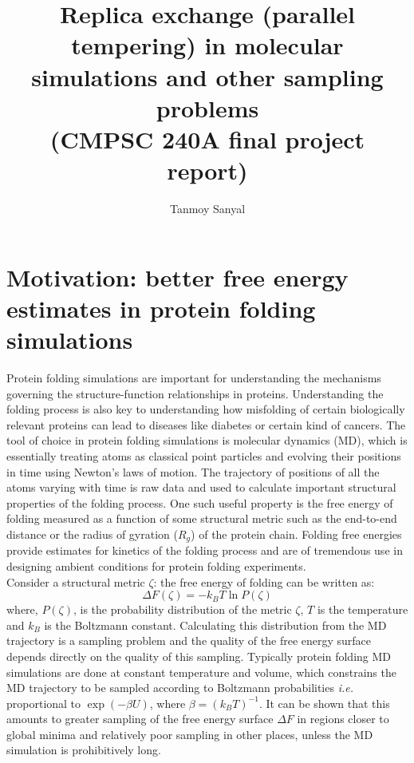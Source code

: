 \documentclass[12pt,letterpaper]{article}
\author{Tanmoy Sanyal}
\title{Replica exchange (parallel tempering) in molecular simulations and other sampling problems \\ (CMPSC 240A final project report)}
\begin{document}
\maketitle


\section*{Motivation: better free energy estimates in protein folding simulations}
\noindent Protein folding simulations are important for understanding the mechanisms governing the structure-function relationships in proteins. Understanding the folding process is also key to understanding how misfolding of certain biologically relevant proteins can lead to diseases like diabetes or certain kind of cancers. The tool of choice in protein folding simulations is molecular dynamics (MD), which is essentially treating atoms as classical point particles and evolving their positions in time using Newton's laws of motion. The trajectory of positions of all the atoms varying with time is raw data and used to calculate important structural properties of the folding process. One such useful property is the free energy of folding measured as a function of some structural metric such as the end-to-end distance or the radius of gyration ($R_g$) of the protein chain. Folding free energies provide estimates for kinetics of the folding process and are of tremendous use in designing ambient conditions for protein folding experiments.\\

\noindent Consider a structural metric $\zeta$: the free energy of folding can be written as:
%
\begin{equation}
\Delta F(\zeta) = -k_B T  \ln P(\zeta)
\end{equation}
%
where, $P(\zeta)$, is the probability distribution of the metric $\zeta$, $T$ is the temperature and $k_B$ is the Boltzmann constant. Calculating this distribution from the MD trajectory is a sampling problem and the quality of the free energy surface depends directly on the quality of this sampling. Typically protein folding MD simulations are done at constant temperature and volume, which constrains the MD trajectory to be sampled according to Boltzmann probabilities \textit{i.e.} proportional to $\exp (-\beta U)$, where $\beta  = (k_BT)^{-1}$. It can be shown that this amounts to greater sampling of the free energy surface $\Delta F$ in regions closer to global minima and relatively poor sampling in other places, unless the MD simulation is prohibitively long.\\
\end{document}
